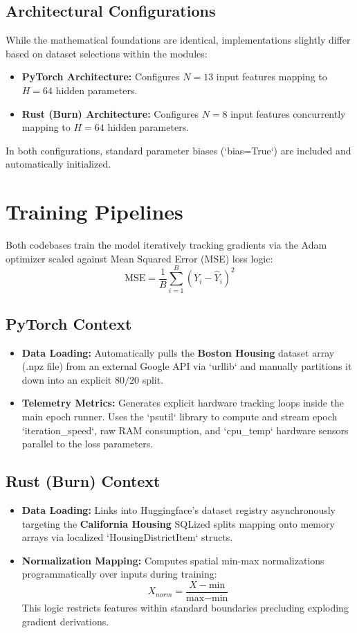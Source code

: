 \documentclass[12pt]{article}
\begin{document}
\subsection{Architectural Configurations}
While the mathematical foundations are identical, implementations slightly differ based on dataset selections within the modules:
\begin{itemize}
    \item \textbf{PyTorch Architecture:} Configures $N=13$ input features mapping to $H=64$ hidden parameters.
    \item \textbf{Rust (Burn) Architecture:} Configures $N=8$ input features concurrently mapping to $H=64$ hidden parameters.
\end{itemize}
In both configurations, standard parameter biases (`bias=True`) are included and automatically initialized.

\section{Training Pipelines}

Both codebases train the model iteratively tracking gradients via the Adam optimizer scaled against Mean Squared Error (MSE) loss logic:
\[ \text{MSE} = \frac{1}{B} \sum_{i=1}^{B} (Y_i - \hat{Y}_i)^2 \]

\subsection{PyTorch Context}
\begin{itemize}
    \item \textbf{Data Loading:} Automatically pulls the \textbf{Boston Housing} dataset array (.npz file) from an external Google API via `urllib` and manually partitions it down into an explicit $80/20$ split.
    \item \textbf{Telemetry Metrics:} Generates explicit hardware tracking loops inside the main epoch runner. Uses the `psutil` library to compute and stream epoch `iteration\_speed`, raw RAM consumption, and `cpu\_temp` hardware sensors parallel to the loss parameters.
\end{itemize}

\subsection{Rust (Burn) Context}
\begin{itemize}
    \item \textbf{Data Loading:} Links into Huggingface's dataset registry asynchronously targeting the \textbf{California Housing} SQLized splits mapping onto memory arrays via localized `HousingDistrictItem` structs.
    \item \textbf{Normalization Mapping:} Computes spatial min-max normalizations programmatically over inputs during training:
    \[ X_{norm} = \frac{X - \text{min}}{\text{max} - \text{min}} \]
    This logic restricts features within standard boundaries precluding exploding gradient derivations.
\end{itemize}
\end{document}
